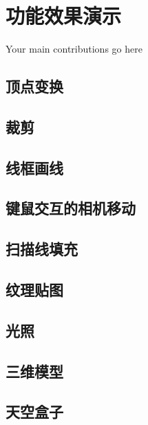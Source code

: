 

    \chapter{功能效果演示}

    Your main contributions go here

    \section{顶点变换}

    \section{裁剪}
    
    \section{线框画线}
    
    \section{键鼠交互的相机移动}
    
    \section{扫描线填充}
    
    \section{纹理贴图}
    
    \section{光照}
    
    \section{三维模型}
    
    \section{天空盒子}

